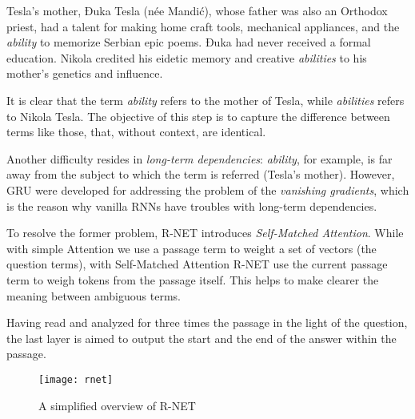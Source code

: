 \begin{enumerate}
  \begin{displayquote}
  Tesla’s mother, Đuka Tesla (née Mandić), whose father was also an Orthodox priest, had a talent for making home craft tools, mechanical appliances, and the \textit{ability} to memorize Serbian epic poems. Đuka had never received a formal education. Nikola credited his eidetic memory and creative \textit{abilities} to his mother’s genetics and influence.
  \end{displayquote}
  
  It is clear that the term \textit{ability} refers to the mother of Tesla, while \textit{abilities} refers to Nikola Tesla. The objective of this step is to capture the difference between terms like those, that, without context, are identical.
  
  Another difficulty resides in \textit{long-term dependencies}: \textit{ability}, for example, is far away from the subject to which the term is referred (Tesla's mother). However, GRU \cite{gru} were developed for addressing the problem of the \textit{vanishing gradients}, which is the reason why vanilla RNNs have troubles with long-term dependencies.
  
  To resolve the former problem, R-NET introduces \textit{Self-Matched Attention}. While with simple Attention we use a passage term to weight a set of vectors (the question terms), with Self-Matched Attention R-NET use the current passage term to weigh tokens from the passage itself. This helps to make clearer the meaning between ambiguous terms.
\end{enumerate}

Having read and analyzed for three times the passage in the light of the question, the last layer is aimed to output the start and the end of the answer within the passage.

\begin{figure}[t]
\centering
\texttt{[image: rnet]}
\caption{A simplified overview of R-NET \cite{imagernetoverview}}
\medskip
\end{figure}
